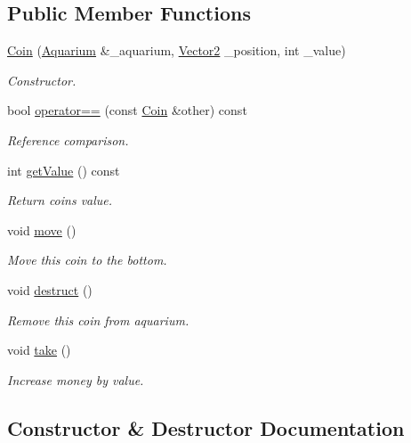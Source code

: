 \subsection*{Public Member Functions}
\begin{DoxyCompactItemize}
\item 
\mbox{\hyperlink{class_coin_a5aa05323e2dab5f755e283d66ef1aae8}{Coin}} (\mbox{\hyperlink{class_aquarium}{Aquarium}} \&\+\_\+aquarium, \mbox{\hyperlink{struct_vector2}{Vector2}} \+\_\+position, int \+\_\+value)
\begin{DoxyCompactList}\small\item\em Constructor. \end{DoxyCompactList}\item 
bool \mbox{\hyperlink{class_coin_a803072934a3da4010352955208e14c4e}{operator==}} (const \mbox{\hyperlink{class_coin}{Coin}} \&other) const
\begin{DoxyCompactList}\small\item\em Reference comparison. \end{DoxyCompactList}\item 
int \mbox{\hyperlink{class_coin_a53c8bf65afdde1422cfda51d753d74b7}{get\+Value}} () const
\begin{DoxyCompactList}\small\item\em Return coin\textquotesingle{}s value. \end{DoxyCompactList}\item 
void \mbox{\hyperlink{class_coin_ab62bca5834489b9b483deaa3ca3470e9}{move}} ()
\begin{DoxyCompactList}\small\item\em Move this coin to the bottom. \end{DoxyCompactList}\item 
void \mbox{\hyperlink{class_coin_a16c42ef0d21f50bb08d4099d82b4ed57}{destruct}} ()
\begin{DoxyCompactList}\small\item\em Remove this coin from aquarium. \end{DoxyCompactList}\item 
void \mbox{\hyperlink{class_coin_abdc8520a89656c688cc70cffa14265ca}{take}} ()
\begin{DoxyCompactList}\small\item\em Increase money by value. \end{DoxyCompactList}\end{DoxyCompactItemize}


\subsection{Constructor \& Destructor Documentation}
\mbox{\label{class_coin_a5aa05323e2dab5f755e283d66ef1aae8}} 
